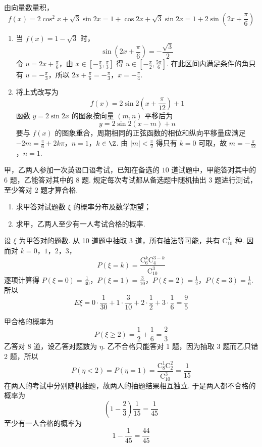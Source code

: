 \begin{solution}
由向量数量积，
\[
f(x)=2\cos^2x+\sqrt3\sin2x
 =1+\cos2x+\sqrt3\sin2x
 =1+2\sin\left(2x+\frac\pi6\right)
\]

\begin{enumerate}
\item 当 \(f(x)=1-\sqrt3\) 时，
\[
\sin\left(2x+\frac\pi6\right)=-\frac{\sqrt3}{2}
\]
令 \(u=2x+\frac\pi6\)，由 \(x\in[-\frac\pi3,\frac\pi3]\) 得 \(u\in[-\frac\pi2,\frac{5\pi}{6}]\).  在此区间内满足条件的角只有 \(u=-\frac\pi3\)，所以
\(2x+\frac\pi6=-\frac\pi3\)，\(x=-\frac\pi4\).

\item 将上式改写为
\[
f(x)=2\sin 2\left(x+\frac\pi{12}\right)+1
\]
函数 \(y=2\sin2x\) 的图象按向量 \((m,n)\) 平移后为
\[
y=2\sin2(x-m)+n
\]
要与 \(f(x)\) 的图象重合，周期相同的正弦函数的相位和纵向平移量应满足
\(-2m=\frac\pi6+2k\pi\)，\(n=1\)，\(k\in\Z\).
由 \(|m|<\frac\pi2\) 得只有 \(k=0\) 可取，故
\(m=-\frac\pi{12}\)，\(n=1\).
\end{enumerate}
\end{solution}

\begin{problem}
甲，乙两人参加一次英语口语考试，已知在备选的 \(10\) 道试题中，甲能答对其中的 \(6\) 题，乙能答对其中的 \(8\) 题. 规定每次考试都从备选题中随机抽出 \(3\) 题进行测试，至少答对 \(2\) 题才算合格.

\begin{enumerate}
\item 求甲答对试题数 \(\xi\) 的概率分布及数学期望；
\item 求甲，乙两人至少有一人考试合格的概率.
\end{enumerate}
\end{problem}

\begin{solution}
设 \(\xi\) 为甲答对的题数. 从 10 道题中抽取 3 道，所有抽法等可能，共有 \(\mathrm C_{10}^3\) 种.  因而对 \(k=0\)，\(1\)，\(2\)，\(3\)，
\[
P(\xi=k)=\frac{\mathrm C_6^k\mathrm C_4^{3-k}}{\mathrm C_{10}^3}
\]
逐项计算得
\(P(\xi=0)=\frac{1}{30}\)，\(P(\xi=1)=\frac{3}{10}\)，\(P(\xi=2)=\frac12\)，\(P(\xi=3)=\frac16\).
所以
\[
E\xi=0\cdot\frac1{30}+1\cdot\frac3{10}+2\cdot\frac12+3\cdot\frac16=\frac95
\]

甲合格的概率为
\[
P(\xi\geqslant2)=\frac12+\frac16=\frac23
\]
乙答对 8 道，设乙答对题数为 \(\eta\). 乙不合格只能答对 1 题，因为抽取 3 题而乙只错 2 题，所以
\[
P(\eta<2)=P(\eta=1)=\frac{\mathrm C_8^1\mathrm C_2^2}{\mathrm C_{10}^3}=\frac1{15}
\]
在两人的考试中分别随机抽题，故两人的抽题结果相互独立. 于是两人都不合格的概率为
\[
\left(1-\frac23\right)\frac1{15}=\frac1{45}
\]
至少有一人合格的概率为
\[
1-\frac1{45}=\frac{44}{45}
\]
\end{solution}

